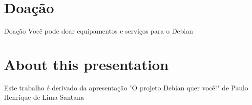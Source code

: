 \documentclass[10pt, compress, aspectratio=169]{beamer}
\begin{document}
\section{Doação}

\begin{frame}{Doação}
  Você pode doar equipamentos e serviços para o Debian
\end{frame}

\section{About this presentation}
\begin{frame}[standout]
    Este trabalho é derivado da apresentação "O projeto Debian quer você!" de
    Paulo Henrique de Lima Santana
   \begin{center}\ccbysa\end{center}
\end{frame}

\maketitle
\end{document}
